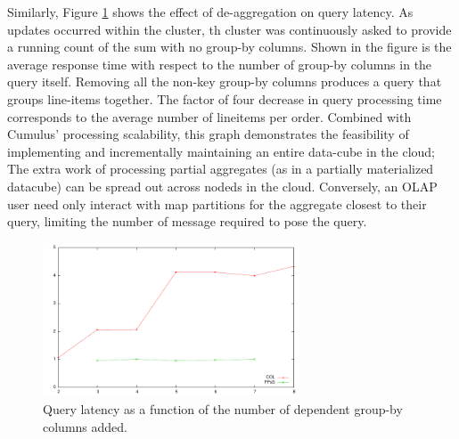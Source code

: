 Similarly, Figure \ref{fig:aggvslatency} shows the effect of de-aggregation on query latency.  As updates occurred within the cluster, th cluster was continuously asked to provide a running count of the sum with no group-by columns.  Shown in the figure is the average response time with respect to the number of group-by columns in the query itself.  Removing all the non-key group-by columns produces a query that groups line-items together.  The factor of four decrease in query processing time corresponds to the average number of lineitems per order.  Combined with Cumulus' processing scalability, this graph demonstrates the feasibility of implementing and incrementally maintaining an entire data-cube in the cloud; The extra work of processing partial aggregates (as in a partially materialized datacube) can be spread out across nodeds in the cloud.  Conversely, an OLAP user need only interact with map partitions for the aggregate closest to their query, limiting the number of message required to pose the query.

\begin{figure}
\begin{center}
\includegraphics[width=3.0in]{images/aggvslatency.pdf}
\caption{Query latency as a function of the number of dependent group-by columns added.}
\label{fig:aggvslatency}
\end{center}
\end{figure}

